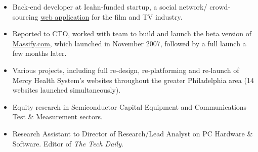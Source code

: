 \documentclass[a4paper,10pt]{memoir} %
\begin{document}

\begin{itemize}
	\item Back-end developer at Icahn-funded startup, a social network/
	crowd-sourcing \href{https://www.nytimes.com/2008/03/10/business/media/10massify.html}{web application} for the film and TV industry.
	
	\item Reported to CTO, worked with team to build and launch the beta 
	version of \href{https://www.massify.com}{Massify.com}, which launched 
	in November 2007, followed by a full launch a few months later. 
\end{itemize}
\Sep %

\begin{itemize}
	\item Various projects, including full re-design, re-platforming and 
	re-launch of Mercy Health System's websites throughout the greater 
	Philadelphia area (14 websites launched simultaneously). 
\end{itemize}
\Sep %



\begin{itemize}
	\item Equity research in Semiconductor Capital Equipment and 
	Communications Test \& Measurement sectors.
\end{itemize}
\Sep %

\begin{itemize}
	\item Research Assistant to Director of Research/Lead Analyst on PC 
	Hardware \& Software. Editor of \textit{The Tech Daily}.
\end{itemize}

\Sep %
\end{document}
